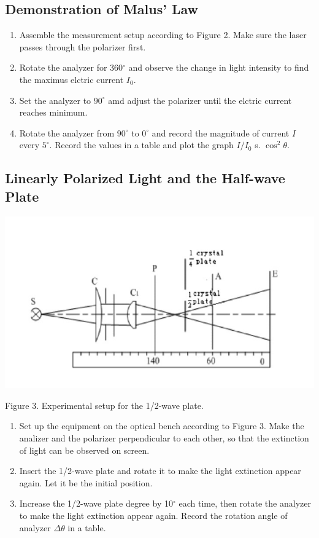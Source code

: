 \documentclass[12pt, a4paper]{article}
\begin{document}
\subsection{Demonstration of Malus' Law}
\begin{enumerate}
	\item Assemble the measurement setup according to Figure 2. Make sure the laser 
passes through the polarizer first.
	\item Rotate the analyzer for 360$^{\circ}$ and observe the change in light intensity 
to find the maximus elctric current $I_0$.
	\item Set the analyzer to $90^{\circ}$ amd adjust the polarizer until the elctric current reaches minimum.
	\item Rotate the analyzer from $90^{\circ}$ to $0^{\circ}$ and record the magnitude of current $I$ every 
$5^{\circ}$. Record the values in a table and plot the graph $I/I_0$ s. $\cos^2 \theta$.
\end{enumerate}

\subsection{Linearly Polarized Light and the Half-wave Plate}
\centerline{
	\includegraphics[scale = 0.6]{6.png}
}
\centerline{Figure 3. Experimental setup for the 1/2-wave plate.}

\begin{enumerate}
	\item Set up the equipment on the optical bench according to Figure 3. Make the analizer and the polarizer 
perpendicular to each other, so that the extinction of light can be observed on screen.
	\item Insert the 1/2-wave plate and rotate it to make the light extinction appear again. Let it be the initial position.
	\item Increase the 1/2-wave plate degree by 10$^{\circ}$ each time, then rotate the analyzer to make the 
light extinction appear again. Record the rotation angle of analyzer $\Delta\theta$ in a table.
\end{enumerate}
\end{document}
